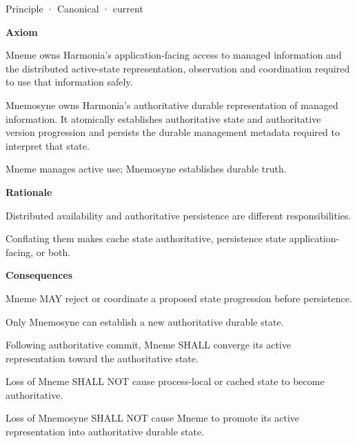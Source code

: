 \label{element:0412a2084f0145babc4f022c71fea65f}
{\small Principle · Canonical · current}\par

\par\medskip\textbf{Axiom}\par


Mneme owns Harmonia's application-facing access to managed information
and the distributed active-state representation, observation and
coordination required to use that information safely.



Mnemosyne owns Harmonia's authoritative durable representation of
managed information. It atomically establishes authoritative state and
authoritative version progression and persists the durable management
metadata required to interpret that state.



Mneme manages active use; Mnemosyne establishes durable truth.



\par\medskip\textbf{Rationale}\par


Distributed availability and authoritative persistence are different
responsibilities.



Conflating them makes cache state authoritative, persistence state
application-facing, or both.



\par\medskip\textbf{Consequences}\par


Mneme MAY reject or coordinate a proposed state progression before
persistence.



Only Mnemosyne can establish a new authoritative durable state.



Following authoritative commit, Mneme SHALL converge its active
representation toward the authoritative state.



Loss of Mneme SHALL NOT cause process-local or cached state to become
authoritative.



Loss of Mnemosyne SHALL NOT cause Mneme to promote its active
representation into authoritative durable state.



